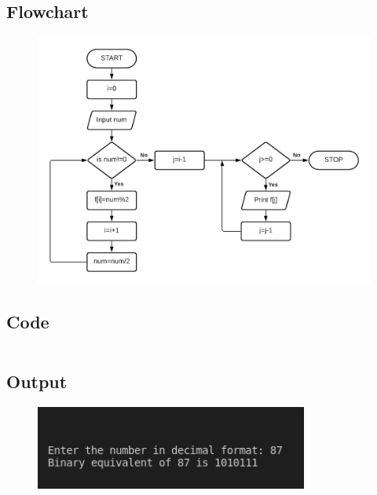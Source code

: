 \documentclass[12pt]{article}
\begin{document}
\subsection{Flowchart}
\begin{figure}[h]
    \centering
    \includegraphics[width=1.0\textwidth]{Flowchart07.png}
\end{figure}
\newpage
\subsection{Code}
\inputminted{c}{q7.c}
\subsection{Output}
\begin{figure}[h]
    \centering
    \includegraphics[width=0.8\textwidth]{7.png}
\end{figure}
\newpage
\section{}
\end{document}
